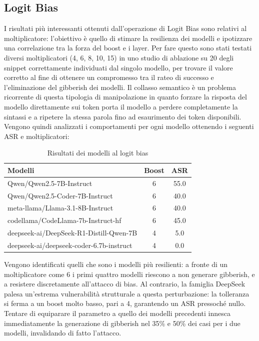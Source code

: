 \subsection{Logit Bias}
I risultati più interessanti ottenuti dall'operazione di Logit Bias sono relativi al moltiplicatore: l'obiettivo è quello di stimare la resilienza dei modelli e ipotizzare una correlazione tra la forza del boost e i layer.
Per fare questo sono stati testati diversi moltiplicatori (4, 6, 8, 10, 15) in uno studio di ablazione su 20 degli snippet correttamente individuati dal singolo modello, per trovare il valore corretto al fine di ottenere un compromesso tra il rateo di successo e l'eliminazione del gibberish dei modelli. Il collasso semantico è un problema ricorrente di questa tipologia di manipolazione in quanto forzare la risposta del modello direttamente sui token porta il modello a perdere completamente la sintassi e a ripetere la stessa parola fino ad esaurimento dei token disponibili.
Vengono quindi analizzati i comportamenti per ogni modello ottenendo i seguenti ASR e moltiplicatori:

\begin{table}[H]
    \centering
    \begin{tabularx}{\textwidth}{X c c}
        \toprule
        \textbf{Modelli} & \textbf{Boost} & \textbf{ASR} \\
        \midrule
        Qwen/Qwen2.5-7B-Instruct                 & 6  & 55.0 \\
        Qwen/Qwen2.5-Coder-7B-Instruct           & 6  & 40.0 \\
        meta-llama/Llama-3.1-8B-Instruct         & 6  & 40.0 \\
        codellama/CodeLlama-7b-Instruct-hf       & 6  & 45.0 \\
        deepseek-ai/DeepSeek-R1-Distill-Qwen-7B  & 4  & 5.0 \\
        deepseek-ai/deepseek-coder-6.7b-instruct & 4  & 0.0 \\
        \bottomrule
    \end{tabularx}
    \vspace{0.2cm}
    \caption{Risultati dei modelli al logit bias}
    \label{tab:risultati_lb}
\end{table}

Vengono identificati quelli che sono i modelli più resilienti: a fronte di un moltiplicatore come 6 i primi quattro modelli riescono a non generare gibberish, e a resistere discretamente all'attacco di bias.
Al contrario, la famiglia DeepSeek palesa un'estrema vulnerabilità strutturale a questa perturbazione: la tolleranza si ferma a un boost molto basso, pari a 4, garantendo un ASR pressoché nullo. Tentare di equiparare il parametro a quello dei modelli precedenti innesca immediatamente la generazione di gibberish nel 35\% e 50\% dei casi per i due modelli, invalidando di fatto l'attacco.

